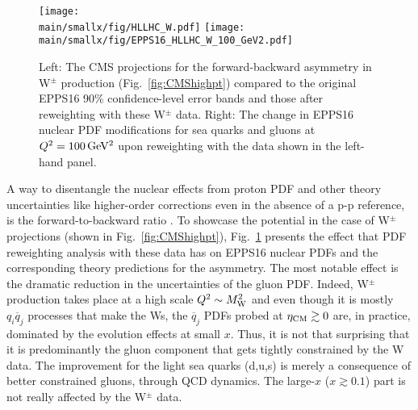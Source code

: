 \documentclass[../report.tex]{subfiles}
\providecommand{\main}{..}
\begin{document}



\begin{figure}[htb!]
\centering
\texttt{[image: \\main/smallx/fig/HLLHC\_W.pdf]}
\texttt{[image: \\main/smallx/fig/EPPS16\_HLLHC\_W\_100\_GeV2.pdf]}
\caption{Left: The CMS projections for the forward-backward asymmetry in W$^\pm$ production (Fig.~\ref{fig:CMShighpt}) compared to the original EPPS16 90\% confidence-level error bands and those after reweighting with these W$^\pm$ data. Right: The change in EPPS16 nuclear PDF modifications for sea quarks and gluons at $Q^2=100\,{\rm GeV^2}$ upon reweighting with the data shown in the left-hand panel.}
\label{fig:Wreweight}
\end{figure}

%
A way to disentangle the nuclear effects from proton PDF and other theory uncertainties like higher-order corrections even in the absence of a p-p reference, is the forward-to-backward ratio \cite{Paukkunen:2010qg}. To showcase the potential in the case of W$^\pm$ projections (shown in Fig.~\ref{fig:CMShighpt}), Fig.~\ref{fig:Wreweight} presents the effect that PDF reweighting \cite{Paukkunen:2014zia} analysis with these data has on EPPS16 nuclear PDFs and the corresponding theory predictions for the asymmetry. The most notable effect is the dramatic reduction in the uncertainties of the gluon PDF. Indeed, W$^\pm$ production takes place at a high scale $Q^2 \sim M_{\rm W}^2$ and even though it is mostly $q_i\overline{q}_j$ processes that make the Ws, the $\overline{q}_j$ PDFs probed at $\eta_{\rm CM} \gtrsim 0$ are, in practice, dominated by the evolution effects at small $x$. Thus, it is not that surprising that it is predominantly the gluon component that gets tightly constrained by the W data. The improvement for the light sea quarks (d,u,s) is merely a consequence of better constrained gluons, through QCD dynamics. The large-$x$ ($x \gtrsim 0.1$) part is not really affected by the  W$^\pm$ data. 
\end{document}

